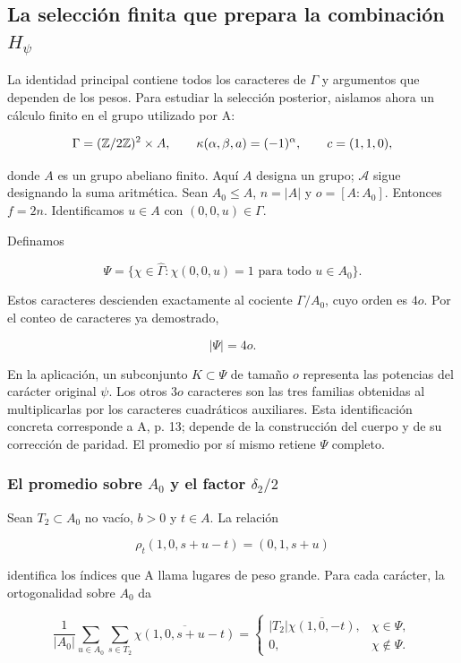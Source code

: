 \subsection{La selección finita que prepara la combinación \texorpdfstring{$H_\psi$}{H psi}}

La identidad principal contiene todos los caracteres de $\Gamma$ y argumentos que dependen de los pesos. Para estudiar la selección posterior, aislamos ahora un cálculo finito en el grupo utilizado por A:

\[
\Gamma=(\mathbb{Z}/2\mathbb{Z})^2\times A,
\qquad \kappa(\alpha,\beta,a)=(-1)^\alpha,
\qquad c=(1,1,0),
\]

donde $A$ es un grupo abeliano finito. Aquí $A$ designa un grupo; $\mathcal A$ sigue designando la suma aritmética. Sean $A_0\le A$, $n=|A|$ y $o=[A:A_0]$. Entonces $f=2n$. Identificamos $u\in A$ con $(0,0,u)\in\Gamma$.

Definamos

\[
\Psi=\{\chi\in\widehat\Gamma:\chi(0,0,u)=1\text{ para todo }u\in A_0\}.
\]

Estos caracteres descienden exactamente al cociente $\Gamma/A_0$, cuyo orden es $4o$. Por el conteo de caracteres ya demostrado,

\begin{equation}
|\Psi|=4o.
\label{car-caracteres-supervivientes}
\end{equation}

En la aplicación, un subconjunto $K\subset\Psi$ de tamaño $o$ representa las potencias del carácter original $\psi$. Los otros $3o$ caracteres son las tres familias obtenidas al multiplicarlas por los caracteres cuadráticos auxiliares. Esta identificación concreta corresponde a A, p. 13; depende de la construcción del cuerpo y de su corrección de paridad. El promedio por sí mismo retiene $\Psi$ completo.

\subsubsection*{El promedio sobre $A_0$ y el factor $\delta_2/2$}

Sean $T_2\subset A_0$ no vacío, $b>0$ y $t\in A$. La relación

\[
\rho_t(1,0,s+u-t)=(0,1,s+u)
\]

identifica los índices que A llama lugares de peso grande. Para cada carácter, la ortogonalidad sobre $A_0$ da

\begin{equation}
\frac1{|A_0|}\sum_{u\in A_0}\sum_{s\in T_2}
\overline{\chi(1,0,s+u-t)}
=
\begin{cases}
|T_2|\overline{\chi(1,0,-t)},&\chi\in\Psi,\\
0,&\chi\notin\Psi.
\end{cases}
\label{car-promedio-subgrupo}
\end{equation}


